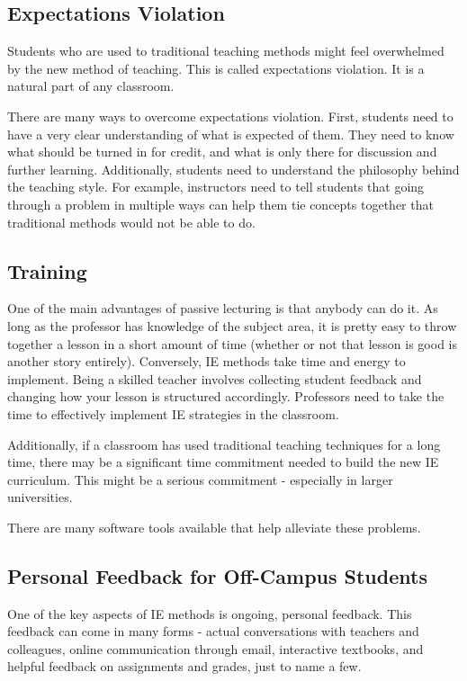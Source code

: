 \subsection{Expectations Violation}

Students who are used to traditional teaching methods might feel overwhelmed by the new method of teaching. This is called expectations violation. It is a natural part of any classroom.

There are many ways to overcome expectations violation. First, students need to have a very clear understanding of what is expected of them. They need to know what should be turned in for credit, and what is only there for discussion and further learning. Additionally, students need to understand the philosophy behind the teaching style. For example, instructors need to tell students that going through a problem in multiple ways can help them tie concepts together that traditional methods would not be able to do.

\subsection{Training}

One of the main advantages of passive lecturing is that anybody can do it. As long as the professor has knowledge of the subject area, it is pretty easy to throw together a lesson in a short amount of time (whether or not that lesson is good is another story entirely). Conversely, IE methods take time and energy to implement. Being a skilled teacher involves collecting student feedback and changing how your lesson is structured accordingly. Professors need to take the time to effectively implement IE strategies in the classroom.

Additionally, if a classroom has used traditional teaching techniques for a long time, there may be a significant time commitment needed to build the new IE curriculum. This might be a serious commitment - especially in larger universities.

There are many software tools available that help alleviate these problems.

\subsection{Personal Feedback for Off-Campus Students}

One of the key aspects of IE methods is ongoing, personal feedback. This feedback can come in many forms - actual conversations with teachers and colleagues, online communication through email, interactive textbooks, and helpful feedback on assignments and grades, just to name a few.

